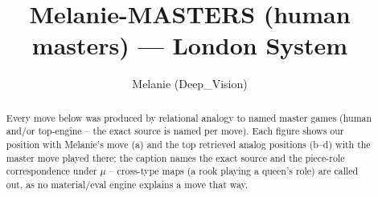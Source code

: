 \documentclass[11pt]{article}
\title{Melanie-MASTERS (human masters) — London System}
\author{Melanie (Deep\_Vision)}
\date{}
\begin{document}
\maketitle

\begin{abstract}Every move below was produced by relational analogy to named master games (human and/or top-engine -- the exact source is named per move). Each figure shows our position with Melanie's move (a) and the top retrieved analog positions (b--d) with the master move played there; the caption names the exact source and the piece-role correspondence under $\mu$ -- cross-type maps (a rook playing a queen's role) are called out, as no material/eval engine explains a move that way.\end{abstract}

\begin{figure}[p]\centering
\begin{subfigure}{0.46\textwidth}\centering
\resizebox{\linewidth}{!}{%
\newchessgame
\chessboard[
  setfen={rnbq1rk1/pp3ppp/3bpn2/2pp4/3P3B/3BPN2/PPP2PPP/RN1QK2R b KQ - 1 7},
  showmover=false,
  pgfstyle=straightmove, color=movearrow, markmove={f8-e8}
]}
\caption{}
\end{subfigure}\hfill
\begin{subfigure}{0.46\textwidth}\centering
\resizebox{\linewidth}{!}{%
\newchessgame
\chessboard[
  setfen={r4rk1/ppqbnppp/2nbp3/3p4/3P4/BPPB1N1P/P4PP1/RN1QR1K1 b - - 2 11},
  showmover=false,
  pgfstyle=straightmove, color=movearrow, markmove={e7-g6}
]}
\caption{}
\end{subfigure}
\\[4pt]
\begin{subfigure}{0.46\textwidth}\centering
\resizebox{\linewidth}{!}{%
\newchessgame
\chessboard[
  setfen={r3k2r/ppq1nppp/2nbp3/1B1p3b/Q2P4/2P2N1P/PP1N1PP1/R1B2RK1 w kq - 1 11},
  showmover=false,
  pgfstyle=straightmove, color=movearrow, markmove={f1-e1}
]}
\caption{}
\end{subfigure}\hfill
\begin{subfigure}{0.46\textwidth}\centering
\resizebox{\linewidth}{!}{%
\newchessgame
\chessboard[
  setfen={5rk1/pbrqbppp/1pnppn2/6B1/3P4/P2BPN1P/1P1NQPP1/R1R3K1 b - - 5 14},
  showmover=false,
  pgfstyle=straightmove, color=movearrow, markmove={f8-c8}
]}
\caption{}
\end{subfigure}

\end{figure}
\end{document}
